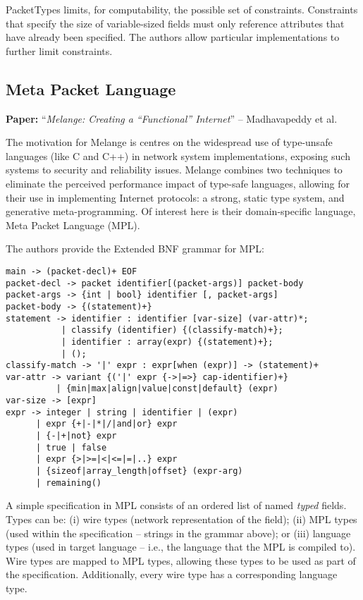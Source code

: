 \documentclass[10pt]{article}
\newcommand{\paper}[3]{\vspace{4mm}\noindent\textbf{Paper:} ``\textit{#1}'' -- #2 \cite{#3}\vspace{3mm}}
\begin{document}
PacketTypes limits, for computability, the possible set of constraints. Constraints that
specify the size of variable-sized fields must only reference attributes that have already
been specified. The authors allow particular implementations to further limit
constraints.

\subsection{Meta Packet Language}
\paper{Melange: Creating a ``Functional'' Internet}{Madhavapeddy et al.}{madhavapeddy2007melange}

The motivation for Melange is centres on the widespread use of type-unsafe languages (like
C and C++) in network system implementations, exposing such systems to security and
reliability issues. Melange combines two techniques to eliminate the perceived performance
impact of type-safe languages, allowing for their use in implementing Internet protocols:
a strong, static type system, and generative meta-programming. Of interest here is their
domain-specific language, Meta Packet Language (MPL).

The authors provide the Extended BNF grammar for MPL:

\begin{verbatim}
main -> (packet-decl)+ EOF
packet-decl -> packet identifier[(packet-args)] packet-body
packet-args -> {int | bool} identifier [, packet-args]
packet-body -> {(statement)+}
statement -> identifier : identifier [var-size] (var-attr)*;
           | classify (identifier) {(classify-match)+};
           | identifier : array(expr) {(statement)+};
           | ();
classify-match -> '|' expr : expr[when (expr)] -> (statement)+
var-attr -> variant {('|' expr {->|=>} cap-identifier)+}
          | {min|max|align|value|const|default} (expr)
var-size -> [expr]
expr -> integer | string | identifier | (expr)
      | expr {+|-|*|/|and|or} expr
      | {-|+|not} expr
      | true | false
      | expr {>|>=|<|<=|=|..} expr
      | {sizeof|array_length|offset} (expr-arg)
      | remaining()
\end{verbatim}

A simple specification in MPL consists of an ordered list of named \emph{typed} fields.
Types can be: (i) wire types (network representation of the field); (ii) MPL types (used
within the specification -- strings in the grammar above); or (iii) language types (used
in target language -- i.e., the language that the MPL is compiled to). Wire types are
mapped to MPL types, allowing these types to be used as part of the specification.
Additionally, every wire type has a corresponding language type. 
\end{document}
